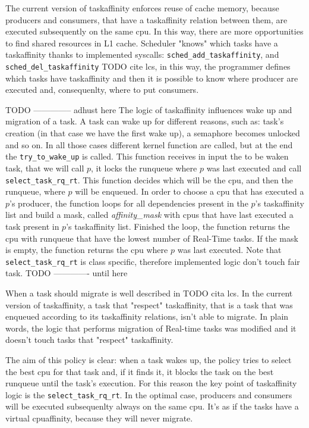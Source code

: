 The current version of taskaffinity enforces reuse of cache memory, because producers and consumers, that have a taskaffinity relation between them, are 
executed subsequently on the same cpu. In this way, there are more opportunities to find shared resources in L1 cache. Scheduler "knows" which tasks have a 
taskaffinity thanks to implemented syscalls: \texttt{sched\_add\_taskaffinity}, and \texttt{sched\_del\_taskaffinity} TODO cite lcs, in this way, the 
programmer defines which tasks have taskaffinity and then it is possible to know where producer are executed and, consequenlty, where to put consumers.

TODO -------------- adhust here
The logic of taskaffinity influences wake up and migration of a task. A task can wake up for different reasons, such as: task's creation (in that case 
we have the first wake up), a semaphore becomes unlocked and so on. In all those cases different kernel function are called, but at the end the 
\texttt{try\_to\_wake\_up} is called. This function receives in input the to be waken task, that we will call $p$, it locks the runqueue where $p$ was last 
executed and call \texttt{select\_task\_rq\_rt}. This function decides which will be the cpu, and then the runqueue, where $p$ will be enqueued. In order 
to choose a cpu that has executed a $p$'s producer, the function loops for all dependencies present in the $p$'s taskaffinity list and build a mask, 
called \textit{affinity\_mask} with cpus that have last executed a task present in $p$'s taskaffinity list. Finished the loop, the function returns the cpu 
with runqueue that have the lowest number of Real-Time tasks. If the mask is empty, the function returns the cpu where $p$ was last executed. Note that 
\texttt{select\_task\_rq\_rt} is class specific, therefore implemented logic don't touch fair task.
TODO ------------- until here

When a task should migrate is well described in TODO cita lcs. In the current version of taskaffinity, a task that "respect" taskaffinity, that is a task 
that was enqueued according to its taskaffinity relations, isn't able to migrate. In plain words, the logic that performs migration of 
Real-time tasks was modified and it doesn't touch tasks that "respect" taskaffinity.

The aim of this policy is clear: when a task wakes up, the policy tries to select the best cpu for that task and, if it finds it, it blocks the task on the 
best runqueue until the task's execution. For this reason the key point of taskaffinity logic is the \texttt{select\_task\_rq\_rt}. In the optimal case, 
producers and consumers will be executed subsequenlty always on the same cpu. It's as if the tasks have a virtual cpuaffinity, because they will never 
migrate.

